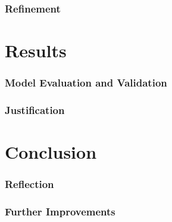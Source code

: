 \documentclass[a4paper,12pt]{article}
\begin{document}
\section{Refinement}


\part{Results}
\section{Model Evaluation and Validation}
\section{Justification}


\part{Conclusion}
\section{Reflection}
\section{Further Improvements}

\end{document}

